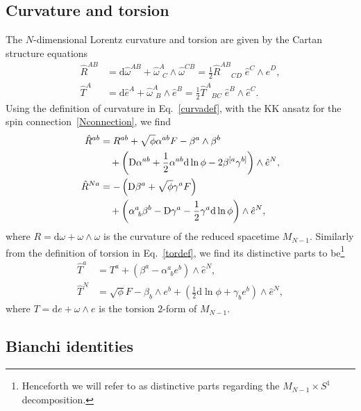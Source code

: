 \documentclass[aps,prd,12pt,superscriptaddress,showpacs,showkeys,reprint,nofootinbib]{revtex4-1}
\begin{document}
\subsection{Curvature and torsion}

The $N$-dimensional Lorentz curvature and torsion are given by the Cartan structure equations
\begin{align}
  \label{curvadef}
  \hat{R}^{AB} &= \mbox{d}\hat{\omega}^{AB}+\hat{\omega}^A_{\ \ C}\wedge\hat{\omega}^{CB} = \frac{1}{2} \hat{R}^{AB}{}_{CD} \; \hat{e}^C \wedge \hat{e}^D,\\
  \label{tordef}
  \hat{T}^A &= \mbox{d}\hat{e}^A+\hat{\omega}^A_{\ \ B}\wedge\hat{e}^B = \frac{1}{2} \hat{T}^{A}{}_{BC} \; \hat{e}^B \wedge \hat{e}^C. 
\end{align}
Using the definition of curvature in Eq.~\eqref{curvadef},  with the KK ansatz for the spin connection~\eqref{Nconnection}, we find
\begin{align}
  \label{R1}
  \hat{R}^{ab}&=R^{ab}+\sqrt{\phi}\alpha^{ab}F-\beta^a\wedge\beta^b\notag\\
  & \quad +\left(\mbox{D}\alpha^{ab}+\frac{1}{2}\alpha^{ab}\mbox{d}\ln\phi-2\beta^{[a}\gamma^{b]}\right)\wedge\hat{e}^N,\\
  \label{R2}
  \hat{R}^{Na}&=-\left(\mbox{D}\beta^a+\sqrt{\phi}\gamma^a F\right)\notag\\
  & \quad +\left(\alpha^a_{\ b}\beta^b-\mbox{D}\gamma^a-\frac{1}{2}\gamma^a\mbox{d}\ln\phi\right)\wedge\hat{e}^N,
\end{align}
where $R=\text{d}\omega+\omega\wedge\omega$ is the curvature of the reduced spacetime $M_{N-1}$. Similarly from the definition of torsion in Eq.~\eqref{tordef}, we find its distinctive parts to be\footnote{Henceforth we will refer to as distinctive parts regarding the $M_{N-1}\times S^1$ decomposition.}
\begin{align}\label{T1}
  \hat{T}^a &= T^a+\left(\beta^a-\alpha^a_{\ \ b}e^b\right)\wedge\hat{e}^N,\\
  \label{T2}
  \hat{T}^N &= \sqrt{\phi}F-\beta_b\wedge e^b+\left(\frac{1}{2}\mbox{d}\ln\phi+\gamma_be^b\right)\wedge\hat{e}^N,
\end{align}
where $T=\text{d}e+\omega\wedge e$ is the torsion $2$-form of $M_{N-1}$.

\subsection{Bianchi identities\label{sec:bianchi}}
\end{document}
